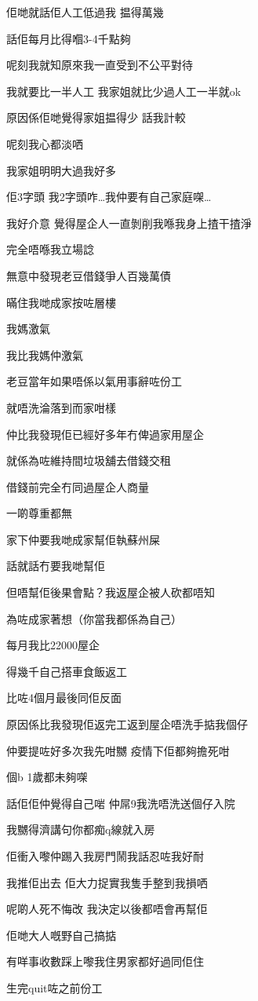 佢哋就話佢人工低過我 揾得萬幾

話佢每月比得嗰3-4千點夠

呢刻我就知原來我一直受到不公平對待

我就要比一半人工 我家姐就比少過人工一半就ok

原因係佢哋覺得家姐揾得少 話我計較

呢刻我心都淡哂

我家姐明明大過我好多

佢3字頭 我2字頭咋…我仲要有自己家庭㗎…

我好介意 覺得屋企人一直剝削我喺我身上揸干揸淨

完全唔喺我立場諗

無意中發現老豆借錢爭人百幾萬債

暪住我哋成家按咗層樓

我媽激氣

我比我媽仲激氣

老豆當年如果唔係以氣用事辭咗份工

就唔洗淪落到而家咁樣

仲比我發現佢已經好多年冇俾過家用屋企

就係為咗維持間垃圾舖去借錢交租

借錢前完全冇同過屋企人商量

一啲尊重都無

家下仲要我哋成家幫佢執蘇州屎

話就話冇要我哋幫佢

但唔幫佢後果會點？我返屋企被人砍都唔知

為咗成家著想（你當我都係為自己）

每月我比22000屋企

得幾千自己搭車食飯返工

比咗4個月最後同佢反面

原因係比我發現佢返完工返到屋企唔洗手掂我個仔

仲要提咗好多次我先咁嬲 疫情下佢都夠擔死咁

個b 1歲都未夠㗎

話佢佢仲覺得自己啱 仲屌9我洗唔洗送個仔入院

我嬲得濟講句你都痴q線就入房

佢衝入嚟仲踢入我房門鬧我話忍咗我好耐

我推佢出去 佢大力捉實我隻手整到我損哂

呢啲人死不悔改 我決定以後都唔會再幫佢

佢哋大人嘅野自己搞掂

有咩事收數踩上嚟我住男家都好過同佢住

生完quit咗之前份工


